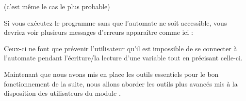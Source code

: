  (c'est même le cas le plus probable)


Si vous exécutez le programme sans que l'automate ne soit accessible, vous devriez voir plusieurs messages d'erreurs apparaître comme ici :


Ceux-ci ne font que prévenir l'utilisateur qu'il est impossible de se connecter à l'automate pendant l'écriture/la lecture d'une variable tout en précisant celle-ci.


Maintenant que nous avons mis en place les outils essentiels pour le bon fonctionnement de la suite, nous allons aborder les outils plus avancés mis à la disposition des utilisateurs du module .\\

